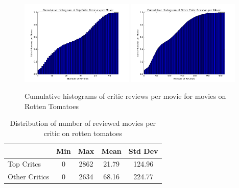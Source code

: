 \documentclass[12pt]{article}
\begin{document}
	\begin{figure}[H]
	    \centering
	    \includegraphics[width=0.48\textwidth]{plots/plot_r_mov_top.png}
	    \includegraphics[width=0.48\textwidth]{plots/plot_r_mov_oth.png}
	    \caption{Cumulative histograms of critic reviews per movie for movies on Rotten Tomatoes}
	    \label{fig:r_mov} 
	\end{figure}


	\begin{table}[H]
	 \centering
	 \caption{Distribution of number of reviewed movies per critic on rotten tomatoes} 
	 \begin{tabular}{ l | c | c | c | c }
	 \hline
	 &  Min & Max & Mean & Std Dev  \\
	 \hline
	 Top Critcs & 0 & 2862 & 21.79 & 124.96 \\
	 Other Critics & 0 & 2634 & 68.16 & 224.77 \\
	 \hline
	 \end{tabular}
	 \end{table}
\end{document}
